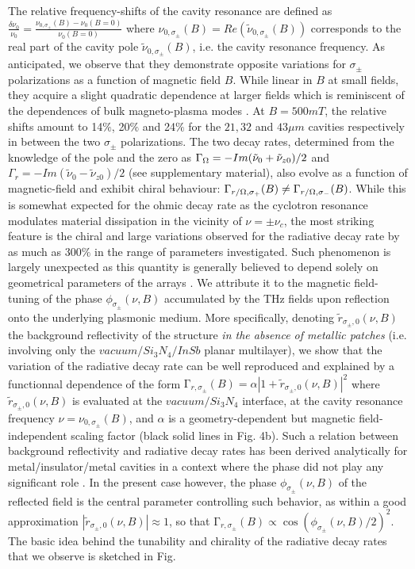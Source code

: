 \documentclass[twocolumn]{article}
\begin{document}
\noindent The relative frequency-shifts of the cavity resonance are defined as $\frac{\delta {\nu }_{0}}{{\nu }_{0}} = \frac{{\nu }_{0,\sigma_{\pm}}(B)-{\nu }_{0}(B=0)}{{\nu }_{0}(B=0)}$ where ${\nu }_{0,\sigma_{\pm}}(B)=Re(\tilde{\nu }_{0,\sigma_{\pm}}(B))$ corresponds to the real part of the cavity pole $\tilde{\nu }_{0,\sigma_{\pm}}(B)$, i.e. the cavity resonance frequency. As anticipated, we observe that they demonstrate opposite variations for $\sigma_{\pm}$ polarizations as a function of magnetic field $B$. While linear in $B$ at small fields, they acquire a slight quadratic dependence at larger fields which is reminiscent of the dependences of bulk magneto-plasma modes \cite{Wang_2009}. At $B=500 mT$, the relative shifts amount to 14$\%$, 20$\%$ and 24$\%$ for the $21, 32$ and $43\mu m$ cavities respectively in between the two $\sigma_{\pm}$ polarizations. The two decay rates, determined from the knowledge of the pole and the zero as $\Gamma_{\ohm}=-Im(\tilde{\nu}_0+\tilde{\nu}_{z0})/2$ and $\Gamma_{r}=-Im(\tilde{\nu}_0-\tilde{\nu}_{z0})/2$ (see supplementary material), also evolve as a function of magnetic-field and exhibit chiral behaviour: ${\mathrm{\Gamma }}_{r/ \ohm,\sigma_{+}}(B)\neq{\mathrm{\Gamma }}_{r/ \ohm,\sigma_{-}}(B)$. While this is somewhat expected for the ohmic decay rate as the cyclotron resonance modulates material dissipation in the vicinity of $\nu=\pm \nu_c$, the most striking feature is the chiral and large variations observed for the radiative decay rate by as much as 300$\%$ in the range of parameters investigated. Such phenomenon is largely unexpected as this quantity is generally believed to depend solely on geometrical parameters of the arrays \cite{Manceau_2013, Qu_2015, Feuillet_Palma_2013}. We attribute it to the magnetic field-tuning of the phase $\phi_{\sigma_{\pm}}(\nu,B)$ accumulated by the THz fields upon reflection onto the underlying plasmonic medium. More specifically, denoting $\tilde{r}_{\sigma_{\pm},0}(\nu,B)$ the background reflectivity of the structure \textit{in the absence of metallic patches} (i.e. involving only the $vacuum/Si_3 N_4/InSb$ planar multilayer), we show that the variation of the radiative decay rate can be well reproduced and explained by a functionnal dependence of the form ${\mathrm{\Gamma }}_{r,\sigma_{\pm}}(B)=\alpha \left| 1+\tilde{r}_{\sigma_{\pm},0}(\nu,B) \right| ^2 $ where $\tilde{r}_{\sigma_{\pm},0}(\nu,B)$ is evaluated at the $vacuum/Si_3 N_4$ interface, at the cavity resonance frequency $\nu=\nu_{0,\sigma_{\pm}}(B)$, and $\alpha$ is a geometry-dependent but magnetic field-independent scaling factor (black solid lines in Fig. 4b). Such a relation between background reflectivity and radiative decay rates has been derived analytically for metal/insulator/metal cavities in a context where the phase did not play any significant role \cite{Bowen_2016,Bowen_2017}. In the present case however, the phase $\phi_{\sigma_{\pm}}(\nu,B)$  of the reflected field is the central parameter controlling such behavior, as within a good approximation $\left|\tilde{r}_{\sigma_{\pm},0}(\nu,B) \right| \approx 1$, so that ${\mathrm{\Gamma }}_{r,\sigma_{\pm}}(B) \propto \cos(\phi_{\sigma_{\pm}}(\nu,B)/2)^2 $. The basic idea behind the tunability and chirality of the radiative decay rates that we observe is sketched in Fig. 
\end{document}
